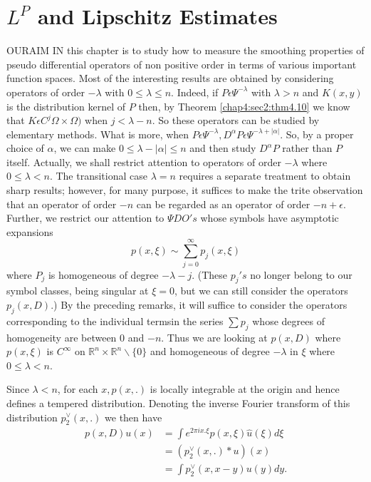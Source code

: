 
\chapter{$L^P$ and Lipschitz Estimates}\label{chap5}%

OUR\pageoriginale AIM IN  this chapter is to study how to measure the smoothing
properties of pseudo differential operators of non positive order in
terms of various important function spaces. Most of the interesting
results are obtained by considering operators of order $ - \lambda $
with  $ 0 \leq \lambda \leq n$. Indeed, if $P \epsilon \Psi ^{-
  \lambda} $ with $ \lambda > n $ and $ K (x,y)$ is the  distribution
kernel of $P$ then, by  Theorem \ref{chap4:sec2:thm4.10} we know that
$ K \epsilon 
C^j \Omega \times \Omega )$ when $j < \lambda -n$. So these operators
can be studied by elementary methods. What is more, when  $P
\epsilon  \Psi ^{-\lambda}, D ^ {\alpha} P \epsilon \Psi ^{-
  \lambda + | \alpha |}$.  So, by a proper choice of $\alpha$,  we can
make $0 \leq \lambda - | \alpha | \leq n $ and then study $ D^ \alpha
P $ rather than $P$ itself.  Actually, we shall restrict attention to
operators of order $- \lambda $ where $ 0 \leq \lambda < n $. The
transitional case $\lambda = n$ requires a separate treatment to
obtain sharp  results; however,  for many purpose, it suffices  to
make the trite observation  that an operator of order $-n$ can be
regarded as an operator of order $-n + \epsilon $. Further, we
restrict our attention to  $\Psi DO's$ whose symbols have asymptotic
expansions  
$$
p (x, \xi ) \sim \sum_{j=0}^{\infty} p_j (x,\xi )
$$
where  $P_j$ is homogeneous of degree $- \lambda - j $. (These $p_j '
s$ no  longer belong to our symbol classes, being   singular at $\xi
=0$,  but we can  still consider the operators $p_j (x,D)$.) By the
preceding remarks, it will  suffice to consider the operators
corresponding to the individual terms\pageoriginale in the series $ \sum p
_j$ whose degrees of homogeneity are  between $0$ and $- n$. Thus we
are looking at $p(x, D)$ where $p(x, \xi)$ is $C^{\infty}$ on $
\mathbb{R}^n \times 
\mathbb{R}^n \backslash\{0\}$ and homogeneous of degree $-\lambda $ in
$\xi $ where $ 0\leq \lambda < n$. 

Since $\lambda < n$, for each $x, p(x,.) $ is locally integrable at
the origin and hence defines a tempered distribution. Denoting the
inverse Fourier transform of this distribution  $p_2^\vee (x,.)$ we
then have 	 
\begin{align*}
  p(x,D)  u  (x) &= \int e^{2 \pi i x. \xi } p(x, \xi ) \hat{u}(\xi) d \xi\\
  &= (p_2^{ \vee }(x,.) * u) (x)\\
  &= \int p_2^{\vee} (x, x-y) u (y) dy.
\end{align*}


